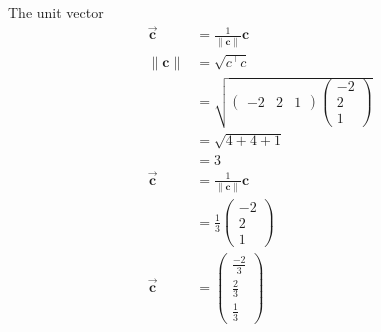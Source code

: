 \documentclass[12pt]{article}
\newcommand{\myvec}[1]{\ensuremath{\begin{pmatrix}#1\end{pmatrix}}}
\providecommand{\norm}[1]{\left\lVert#1\right\rVert}
\let\vec\mathbf
\begin{document}
\begin{enumerate}
\begin{align}
\end{align}
The unit vector 
\begin{align}
\overrightarrow{\vec{c}}&=\frac{1}{\norm{\vec{c}}}\vec{c}\\
{\norm{\vec{c}}}&=\sqrt{c^\top c}\\
&=\sqrt{\myvec{-2& 2& 1}\myvec{-2\\2\\1}}\\
&=\sqrt{4+4+1}\\
&=3\\
\overrightarrow{\vec{c}}&=\frac{1}{\norm{\vec{c}}}\vec{c}\\
&=\frac{1}{3}\myvec{-2\\2\\1}\\
\overrightarrow{\vec{c}}&=\myvec{\frac{-2}{3}\\[3pt]\frac{2}{3}\\[3pt]\frac{1}{3}}
\end{align}
\end{enumerate} 
\end{document}
